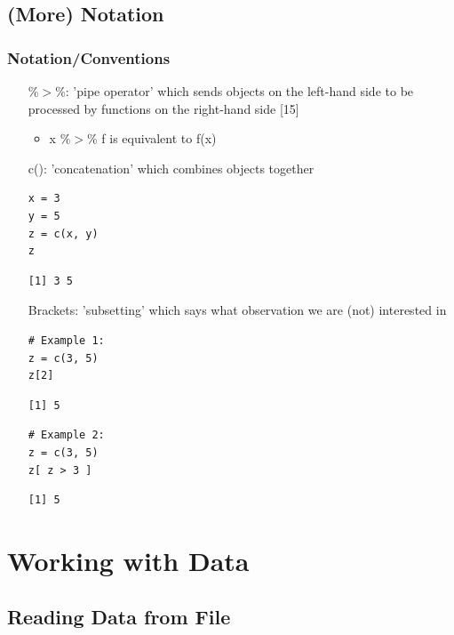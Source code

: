 \subsection{(More) Notation}
\begin{frame}
	\frametitle{Notation/Conventions}

	\vspace{10pt}
	\begin{itemize}
		\item[\%$>$\%:] 'pipe operator' which sends objects on the left-hand side to be processed by functions on the right-hand side [15]
			\begin{itemize}
				\item x \%$>$\% f is equivalent to f(x)
			\end{itemize}
		\item[c():] 'concatenation' which combines objects together
			\begin{lstlisting}
x = 3
y = 5
z = c(x, y) 
z
			\end{lstlisting}
			\begin{verbatim}
[1] 3 5
			\end{verbatim}
		\end{itemize}

\newpage
	\begin{itemize}		
		\item[Brackets:] 'subsetting' which says what observation we are (not) interested in
			\begin{lstlisting}
# Example 1:
z = c(3, 5) 
z[2]
			\end{lstlisting}
			\begin{verbatim}
[1] 5
			\end{verbatim}		
			\begin{lstlisting}
# Example 2:
z = c(3, 5) 
z[ z > 3 ]
			\end{lstlisting}
			\begin{verbatim}
[1] 5
			\end{verbatim}						
	\end{itemize}

\end{frame}


\section{Working with Data}

\subsection{Reading Data from File}

